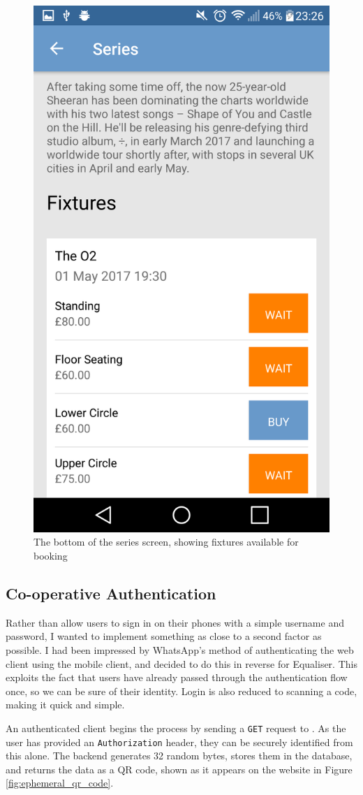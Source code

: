 \documentclass[12pt,a4paper]{bhamdissertation}
\newcommand{\code}[1]{\texttt{#1}}
\begin{document}
\begin{figure}[!htbp]
    \centering
    \includegraphics[width=.5\linewidth]{img/app_fixtures.png}
    \caption{The bottom of the series screen, showing fixtures available for booking}
    \label{img:app_fixtures}
\end{figure}

\subsection{Co-operative Authentication}

Rather than allow users to sign in on their phones with a simple username and password, I wanted to implement something as close to a second factor as possible. I had been impressed by WhatsApp's method of authenticating the web client using the mobile client, and decided to do this in reverse for Equaliser. This exploits the fact that users have already passed through the authentication flow once, so we can be sure of their identity. Login is also reduced to scanning a code, making it quick and simple.

An authenticated client begins the process by sending a \code{GET} request to \code{}. As the user has provided an \code{Authorization} header, they can be securely identified from this alone. The backend generates 32 random bytes, stores them in the database, and returns the data as a QR code, shown as it appears on the website in Figure \ref{fig:ephemeral_qr_code}.
\end{document}
